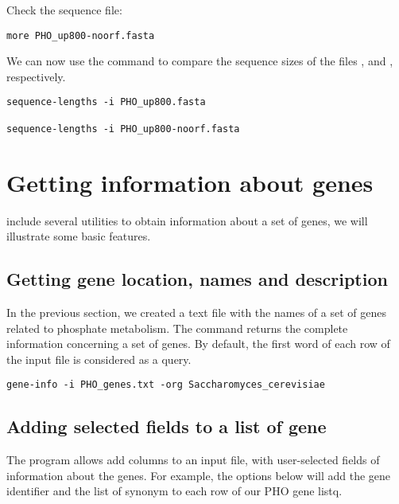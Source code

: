 Check the sequence file:

{\color{Blue} \begin{footnotesize}
\begin{verbatim}
more PHO_up800-noorf.fasta
\end{verbatim} \end{footnotesize}
}

We can now use the command  to compare the
sequence sizes of the files , and
, respectively.

{\color{Blue} \begin{footnotesize}
\begin{verbatim}
sequence-lengths -i PHO_up800.fasta

sequence-lengths -i PHO_up800-noorf.fasta
\end{verbatim} \end{footnotesize}
}

\section{Getting information about genes}

\RSAT include several utilities to obtain information about a set of
genes, we will illustrate some basic features. 

\subsection{Getting gene location, names and description}

In the previous section, we created a text file with the names of a
set of genes related to phosphate metabolism. The command
 returns the complete information concerning a set
of genes. By default, the first word of each row of the input file is
considered as a query.

{\color{Blue} \begin{footnotesize}
\begin{verbatim}
gene-info -i PHO_genes.txt -org Saccharomyces_cerevisiae
\end{verbatim} \end{footnotesize}
}


\subsection{Adding selected fields to a list of gene}

The program  allows add columns to an input
file, with user-selected fields of information about the genes. For
example, the options below will add the gene identifier and the list
of synonym to each row of our PHO gene listq. 

